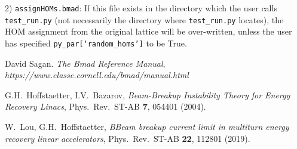 \documentclass{hitec}
\begin{document}
2) \texttt{assignHOMs.bmad}: If this file exists in the directory which the user calls \texttt{test_run.py}  (not necessarily the directory where \texttt{test_run.py} locates), the HOM assignment from the original lattice will be over-written, unless the user has specified \texttt{py_par[`random_homs']} to be True.


\begin{thebibliography}{99}

David Sagan. {\em The Bmad Reference Manual},\\
{\em https://www.classe.cornell.edu/bmad/manual.html}

G.H.~Hoffstaetter, I.V.~Bazarov, \emph{Beam-Breakup Instability Theory for Energy Recovery Linacs},
Phys.~Rev.~ST-AB {\bf 7}, 054401 (2004).

W.~Lou, G.H.~Hoffstaetter, \emph{BBeam breakup current limit in multiturn energy recovery linear accelerators},
Phys.~Rev.~ST-AB {\bf 22}, 112801 (2019).

\end{thebibliography}
\end{document}
